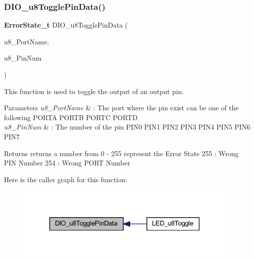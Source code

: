 \subsubsection{D\+I\+O\+\_\+u8\+Toggle\+Pin\+Data()}
{\footnotesize\ttfamily \textbf{ Error\+State\+\_\+t} D\+I\+O\+\_\+u8\+Toggle\+Pin\+Data (\begin{DoxyParamCaption}\item[{\textbf{ D\+I\+O\+Port\+\_\+t}}]{u8\+\_\+\+Port\+Name,  }\item[{\textbf{ D\+I\+O\+Pin\+\_\+t}}]{u8\+\_\+\+Pin\+Num }\end{DoxyParamCaption})}



This function is used to toggle the output of an output pin. 


\begin{DoxyParams}{Parameters}
{\em u8\+\_\+\+Port\+Name} & \+: The port where the pin exist can be one of the following P\+O\+R\+TA P\+O\+R\+TB P\+O\+R\+TC P\+O\+R\+TD \\
\hline
{\em u8\+\_\+\+Pin\+Num} & \+: The number of the pin P\+I\+N0 P\+I\+N1 P\+I\+N2 P\+I\+N3 P\+I\+N4 P\+I\+N5 P\+I\+N6 P\+I\+N7 \\
\hline
\end{DoxyParams}
\begin{DoxyReturn}{Returns}
returns a number from 0 -\/ 255 represent the Error State 255 \+: Wrong P\+IN Number 254 \+: Wrong P\+O\+RT Number 
\end{DoxyReturn}
Here is the caller graph for this function\+:\nopagebreak
\begin{figure}[H]
\begin{center}
\leavevmode
\includegraphics[width=308pt]{_d_i_o_8c_a8caffe2a4db322f3e6de4c4b55b9a842_icgraph}
\end{center}
\end{figure}
